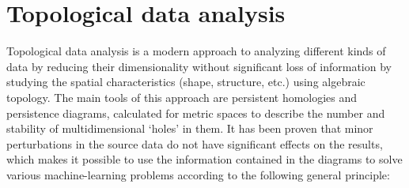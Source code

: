 \documentclass[10pt]{iopart}
\begin{document}
\section{Topological data analysis}

Topological data analysis is a modern approach to analyzing different kinds of data by reducing their dimensionality without significant loss of information by studying the spatial characteristics (shape, structure, etc.) using algebraic topology. The main tools of this approach are persistent homologies and persistence diagrams, calculated for metric spaces to describe the number and stability of multidimensional `holes' in them. It has been proven that minor perturbations in the source data do not have significant effects on the results, which makes it possible to use the information contained in the diagrams to solve various machine-learning problems according to the following general principle:
\end{document}
